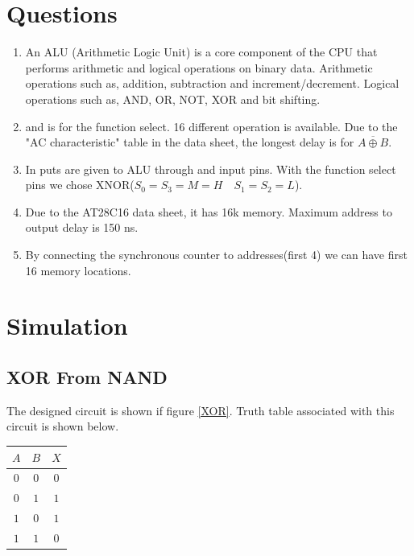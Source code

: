\documentclass[12pt]{article}
\begin{document}
	
	\newpage
	\pagestyle{fancy}
	\fancyhf{}
	\cfoot{\thepage}
	
	\section{Questions}
	\begin{enumerate}
		\item 
		An ALU (Arithmetic Logic Unit) is a core component of the CPU that performs arithmetic and logical operations on binary data. Arithmetic operations such as, addition, subtraction and increment/decrement. Logical operations such as, AND, OR, NOT, XOR and bit shifting. 
		\item 
		 and  is for the function select. 16 different operation is available.
		Due to the "AC characteristic" table in the data sheet, the longest delay is for $\overline{A \oplus B}$.
		\item 
			In puts are given to ALU through  and  input pins. With the function select pins we chose XNOR($S_0 = S_3=M = H\quad S_1 = S_2 = L$). 
			
		\item 
			Due to the AT28C16 data sheet, it has 16k memory. Maximum address to output delay is 150 ns.
		\item 
		By connecting the synchronous counter to addresses(first 4) we can have first 16 memory locations.
	\end{enumerate}
	
	\section{Simulation}
	\subsection{XOR From NAND}
	The designed circuit is shown if figure \eqref{XOR}. Truth table associated with this circuit is shown below.
		\begin{center}
			\begin{tabular}{cc|c}
				$A$&$B$&$X$\\
				\hline
				$0$&$0$&$0$\\
				$0$&$1$&$1$\\
				$1$&$0$&$1$\\
				$1$&$1$&$0$\\
			\end{tabular}
		\end{center}
		
\end{document}
